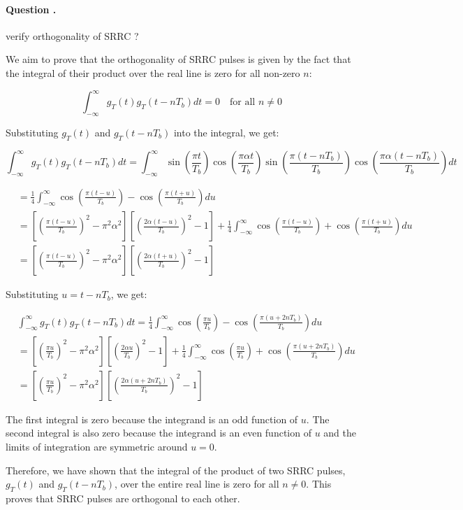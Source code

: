 \documentclass[14pt,a4paper]{report}
\newcounter{question}
\newcommand*\question{%
\stepcounter{question}%
\paragraph{Question \thesection.\thequestion}}
\begin{document}
\question
{
    verify orthogonality of SRRC ?
}
\begin{answer_box*}
We aim to prove that the orthogonality of SRRC pulses is given by the fact that the integral of their product over the real line is zero for all non-zero $n$:


\begin{equation}
    \int_{-\infty}^{\infty} g_T(t)g_T(t-nT_b)dt = 0 \quad \text{for all } n \neq 0
\end{equation}


Substituting $g_T(t)$ and $g_T(t-nT_b)$ into the integral, we get:


\begin{equation}
\int_{-\infty}^{\infty} g_T(t)g_T(t-nT_b)dt = \int_{-\infty}^{\infty} \sin\left(\frac{\pi t}{T_b}\right)\cos\left(\frac{\pi \alpha t}{T_b}\right)\sin\left(\frac{\pi(t-nT_b)}{T_b}\right)\cos\left(\frac{\pi \alpha(t-nT_b)}{T_b}\right)dt
\end{equation}

\begin{align}
    &= \frac{1}{4}\int_{-\infty}^{\infty} \cos\left(\frac{\pi(t-u)}{T_b}\right)-\cos\left(\frac{\pi(t+u)}{T_b}\right)du \\
    &= \left[\left(\frac{\pi(t-u)}{T_b}\right)^2-\pi^2\alpha^2\right]\left[\left(\frac{2\alpha(t-u)}{T_b}\right)^2-1\right]+\frac{1}{4}\int_{-\infty}^{\infty} \cos\left(\frac{\pi(t-u)}{T_b}\right)+\cos\left(\frac{\pi(t+u)}{T_b}\right)du \\
    &= \left[\left(\frac{\pi(t-u)}{T_b}\right)^2-\pi^2\alpha^2\right]\left[\left(\frac{2\alpha(t+u)}{T_b}\right)^2-1\right]
\end{align}

Substituting $u=t-nT_b$, we get:

\begin{align}
    & \int_{-\infty}^{\infty} g_T(t)g_T(t-nT_b)dt = \frac{1}{4}\int_{-\infty}^{\infty} \cos\left(\frac{\pi u}{T_b}\right)-\cos\left(\frac{\pi(u+2nT_b)}{T_b}\right)du\\
    & = \left[\left(\frac{\pi u}{T_b}\right)^2-\pi^2\alpha^2\right]\left[\left(\frac{2\alpha u}{T_b}\right)^2-1\right]+\frac{1}{4}\int_{-\infty}^{\infty} \cos\left(\frac{\pi u}{T_b}\right)+\cos\left(\frac{\pi(u+2nT_b)}{T_b}\right)du\\
    & = \left[\left(\frac{\pi u}{T_b}\right)^2-\pi^2\alpha^2\right]\left[\left(\frac{2\alpha(u+2nT_b)}{T_b}\right)^2-1\right] 
\end{align}

The first integral is zero because the integrand is an odd function of $u$. The second integral is also zero because the integrand is an even function of $u$ and the limits of integration are symmetric around $u=0$.

Therefore, we have shown that the integral of the product of two SRRC pulses, $g_T(t)$ and $g_T(t-nT_b)$, over the entire real line is zero for all $n\neq 0$. This proves that SRRC pulses are orthogonal to each other.
\end{answer_box*}
\end{document}
